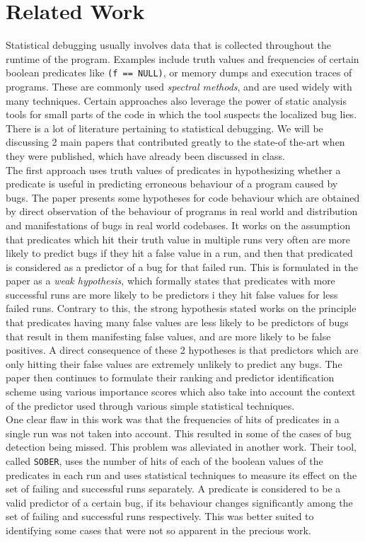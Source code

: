 \documentclass[a4paper,10pt, margin=0.75in]{article}
\begin{document}
\section{Related Work}
Statistical debugging usually involves data that is collected throughout the runtime of the program. Examples include truth values and frequencies of certain boolean predicates like \texttt{(f == NULL)}, or memory dumps and execution traces of programs. These are commonly used \textit{spectral methods}, and are used widely with many techniques. Certain approaches also leverage the power of static analysis tools for small parts of the code in which the tool suspects the localized bug lies.\\
There is a lot of literature pertaining to statistical debugging. We will be discussing 2 main papers that contributed greatly to the state-of the-art when they were published, which have already been discussed in class.\\
The first approach\cite{DBLP:conf/pldi/LiblitNZAJ05} uses truth values of predicates in hypothesizing whether a predicate is useful in predicting erroneous behaviour of a program caused by bugs. The paper presents some hypotheses for code behaviour which are obtained by direct observation of the behaviour of programs in real world and distribution and manifestations of bugs in real world codebases. It works on the assumption that predicates which hit their truth value in multiple runs very often are more likely to predict bugs if they hit a false value in a run, and then that predicated is considered as a predictor of a bug for that failed run. This is formulated in the paper as a \textit{weak hypothesis}, which formally states that predicates with more successful runs are more likely to be predictors i they hit false values for less failed runs. Contrary to this, the strong hypothesis stated works on the principle that predicates having many false values are less likely to be predictors of bugs that result in them manifesting false values, and are more likely to be false positives. A direct consequence of these 2 hypotheses is that predictors which are only hitting their false values are extremely unlikely to predict any bugs. The paper then continues to formulate their ranking and predictor identification scheme using various importance scores which also take into account the context of the predictor used through various simple statistical techniques.\\
One clear flaw in this work was that the frequencies of hits of predicates in a single run was not taken into account. This resulted in some of the cases of bug detection being missed. This problem was alleviated in another work\cite{DBLP:conf/sigsoft/LiuYFHM05}. Their tool, called \texttt{SOBER}, uses the number of hits of each of the boolean values of the predicates in each run and uses statistical techniques to measure its effect on the set of failing and successful runs separately. A predicate is considered to be a valid predictor of a certain bug, if its behaviour changes significantly among the set of failing and successful runs respectively. This was better suited to identifying some cases that were not so apparent in the precious work.\\
\end{document}
